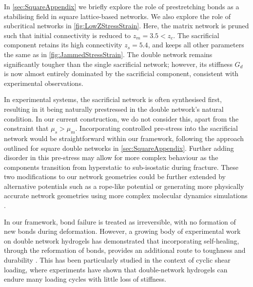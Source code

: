 In \cref{sec:SquareAppendix} we briefly explore the role of prestretching bonds as a stabilising field in square lattice-based networks. We also explore the role of subcritical networks in \cref{fig:LowZStressStrain}. Here, the matrix network is pruned such that initial connectivity is reduced to $z_m=3.5 < z_c$. The sacrificial component retains its high connectivity $z_s=5.4$, and keeps all other parameters the same as in \cref{fig:JammedStressStrain}. The double network remains significantly tougher than the single sacrificial network; however, its stiffness $G_d$ is now almost entirely dominated by the sacrificial component, consistent with experimental observations.

In experimental systems, the sacrificial network is often synthesised first, resulting in it being naturally prestressed in the double network's natural condition. In our current construction, we do not consider this, apart from the constraint that $\mu_s > \mu_m$. Incorporating controlled pre-stress into the sacrificial network would be straightforward within our framework, following the approach outlined for square double networks in \cref{sec:SquareAppendix}. Further adding disorder in this pre-stress may allow for more complex behaviour as the components transition from hyperstatic to sub-isostatic during fracture. These two modifications to our network geometries could be further extended by alternative potentials such as a rope-like potential \cite{arzashStressstabilizedSubisostaticFiber2019a} or generating more physically accurate network geometries using more complex molecular dynamics simulations \cite{mugnaiInterspeciesInteractionsDual2025,rijns_synthetic_2024}.  

In our framework, bond failure is treated as irreversible, with no formation of new bonds during deformation. However, a growing body of experimental work on double network hydrogels has demonstrated that incorporating self-healing, through the reformation of bonds, provides an additional route to toughness and durability \cite{wangRapidSelfstrengtheningDoublenetwork2025,yasuiRateIndependentSelfHealingDouble2022,yinSelfHealingHydrogelsSynthesis2023}. This has been particularly studied in the context of cyclic shear loading, where experiments \cite{zhang_fatigue_2018, chen_improvement_2016, chen_novel_2015} have shown that double-network hydrogels can endure many loading cycles with little loss of stiffness. 

